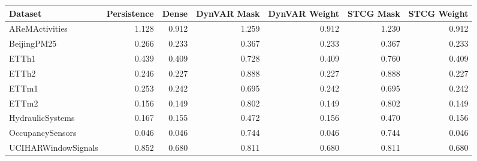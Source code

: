 \begin{tabular}{lrrrrrr}
\toprule
Dataset & Persistence & Dense & DynVAR Mask & DynVAR Weight & STCG Mask & STCG Weight \\
\midrule
AReMActivities & 1.128 & 0.912 & 1.259 & 0.912 & 1.230 & 0.912 \\
BeijingPM25 & 0.266 & 0.233 & 0.367 & 0.233 & 0.367 & 0.233 \\
ETTh1 & 0.439 & 0.409 & 0.728 & 0.409 & 0.760 & 0.409 \\
ETTh2 & 0.246 & 0.227 & 0.888 & 0.227 & 0.888 & 0.227 \\
ETTm1 & 0.253 & 0.242 & 0.695 & 0.242 & 0.695 & 0.242 \\
ETTm2 & 0.156 & 0.149 & 0.802 & 0.149 & 0.802 & 0.149 \\
HydraulicSystems & 0.167 & 0.155 & 0.472 & 0.156 & 0.470 & 0.156 \\
OccupancySensors & 0.046 & 0.046 & 0.744 & 0.046 & 0.744 & 0.046 \\
UCIHARWindowSignals & 0.852 & 0.680 & 0.811 & 0.680 & 0.811 & 0.680 \\
\bottomrule
\end{tabular}
